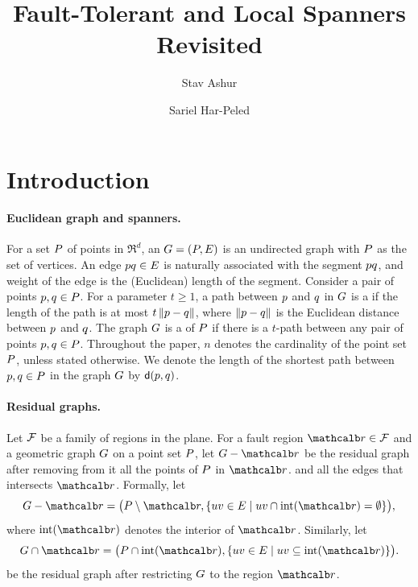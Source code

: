 \documentclass[12pt]{article}%
\begin{document}
\title{Fault-Tolerant and Local Spanners Revisited}
	
\author{%
   Stav Ashur%
   \StavThanks{}%
   \and%
   Sariel Har-Peled%
}%
	
\maketitle


\section{Introduction}

\paragraph{Euclidean graph and spanners.}
For a set $P$ of points in $\Re^d$, an 
$G = (P, E)$ is an undirected graph with $P$ as the set of
vertices. An edge $p q \in E$ is naturally associated with the
segment $pq$, and weight of the edge is the (Euclidean) length of
the segment.  Consider a pair of points $p,q \in P$. For a
parameter $t \geq 1$, a path between $p$ and $q$ in $G$ is a
 if the length of the path is at most
$t \left\| p - q \right\|$, where $\left\| p - q \right\|$ is the Euclidean distance
between $p$ and $q$.  The graph $G$ is a  of
$P$ if there is a $t$-path between any pair of points
$p,q\in P$.  Throughout the paper, $n$ denotes the cardinality
of the point set $P$, unless stated otherwise. We denote the length
of the shortest path between $p,q\in P$ in the graph $G$ by
$\dGY{\pa}{\pb}$.

\paragraph{Residual graphs.}

Let $\mathcal{F}$ be a family of regions in the plane. For a fault region
$\region \in \FF$ and a geometric graph $G$ on a point set $P$, let
$\G \gminus \region$ be the residual graph after removing from it all
the points of $P$ in $\region$. and all the edges that intersects
$\region$.  Formally, let
\begin{equation*}
    \G \gminus \region%
    =%
    \bigl( \PS \setminus \region, \Set{ uv \in \EG }{ uv \cap
       \interiorX{\region} = \emptyset} \bigr),
\end{equation*}
where $\interiorX{\region}$ denotes the interior of
$\region$. Similarly, let
\begin{equation*}
    \restrictY{\G}{\region}%
    =%
    \bigl( \PS \cap \interiorX{\region},
    \Set{uv \in \EG}{ uv \subseteq \interiorX{\region} } \bigr).
\end{equation*}
be the residual graph after restricting $G$ to the region $\region$.
\end{document}
